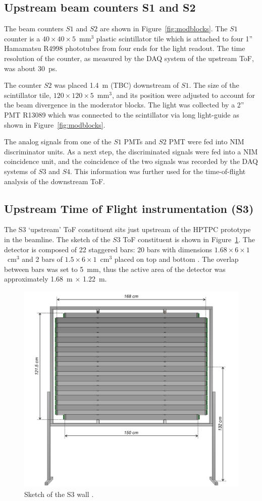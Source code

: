     
	\subsection{Upstream beam counters S1 and S2}
	
	The beam counters $S1$ and $S2$ are shown in Figure~\ref{fig:modblocks}. The $S1$ counter is a $40\times40\times5$~mm$^3$ plastic scintillator tile which is attached to four 1'' Hamamatsu R4998 phototubes from four ends for the light readout. The time resolution of the counter, as measured by the DAQ system of the upstream ToF, was about 30~ps. 
	
	The counter $S2$ was placed 1.4~m (TBC) downstream of $S1$. The size of the scintillator tile, $120\times120\times5$~mm$^3$, and its position were adjusted to account for the beam divergence in the moderator blocks. The light was collected by a 2'' PMT R13089 which was connected to the scintillator via long light-guide as shown in Figure~\ref{fig:modblocks}. 
	
	The analog signals from one of the $S1$ PMTs and $S2$ PMT were fed into NIM discriminator units.
	As a next step, the discriminated signals were fed into a NIM coincidence unit, and the coincidence of the two signals was recorded by the DAQ systems of $S3$ and $S4$. This information was further used for the time-of-flight analysis of the downstream ToF. 

    
\subsection{Upstream Time of Flight instrumentation (S3)}

The S3 `upstream' ToF constituent sits just upstream of the HPTPC prototype in the beamline. The sketch of the $S3$ ToF constituent is shown in Figure~\ref{fig:S3sketch}. The detector is composed of 22 staggered bars:  20 bars with dimensions $1.68 \times 6 \times 1$~cm$^3$ and 2 bars of  $1.5 \times 6 \times 1$~cm$^3$ placed on top and bottom \cite{S3-proceedings}.
The overlap between bars was set to 5~mm, thus the active area of the detector was approximately 1.68~m $\times$ 1.22~m.
     \begin{figure}
      \centering
    \includegraphics[width=0.7\linewidth]{files/Figures/uToF_sketch.pdf}
    	\caption{Sketch of the S3 wall \cite{S3-proceedings}.}
    		\label{fig:S3sketch}
    \end{figure}
    

